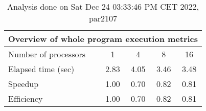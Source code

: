 \begin{table}[h]
\begin{center}
\begin{tabular}{|l|c|c|c|c|}
\hline
\multicolumn{5}{|c|}{Overview of whole program execution metrics} \\
\hline
\hline
Number of processors & 1 & 4 & 8 & 16 \\
\hline
Elapsed time (sec)      &       2.83 &       4.05 &       3.46 &       3.48 \\
\hline
Speedup                 &       1.00 &       0.70 &       0.82 &       0.81 \\
\hline
Efficiency              &       1.00 &       0.70 &       0.82 &       0.81 \\
\hline
\end{tabular}
\end{center}
\caption{ Analysis done on Sat Dec 24 03:33:46 PM CET 2022, par2107}
\end{table}

